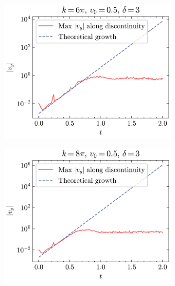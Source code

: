 \documentclass{article}
\begin{document}
\begin{figure}[htbp]
    \hfill
    \begin{subfigure}{0.31\textwidth}
        \centering
        \includegraphics[width=\textwidth]{images/kh_growth_k6.png}
        \caption{}
    \end{subfigure}
    \begin{subfigure}{0.31\textwidth}
        \centering
        \includegraphics[width=\textwidth]{images/kh_growth_k8.png}
        \caption{}
    \end{subfigure}
    \begin{subfigure}{0.31\textwidth}
        \centering

\end{subfigure}
\end{figure}
\end{document}
